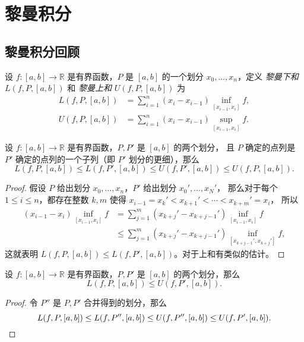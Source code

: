 \documentclass[fontset=none]{Notes}
\begin{document}
\frontmatter

\tableofcontents

\mainmatter

\chapter{黎曼积分}

\section{黎曼积分回顾}

\begin{definition}
  设 $f:[a,b]\to \mathbb{R}$ 是有界函数，$P$ 是 $[a,b]$ 的一个划分
  $x_0,\dots,x_n$，定义 \emph{黎曼下和} $L(f,P,[a,b])$ 和 \emph{黎曼上和}
  $U(f,P,[a,b])$ 为
  \begin{align*}
    L(f,P,[a,b])&=\sum_{i=1}^{n} (x_i-x_{i-1})\inf_{[x_{i-1},x_i]}f,\\
    U(f,P,[a,b])&=\sum_{i=1}^{n} (x_i-x_{i-1})\sup_{[x_{i-1},x_i]}f.
  \end{align*}
\end{definition}

\begin{lemma}[黎曼和不等式]
  设 $f:[a,b]\to \mathbb{R}$ 是有界函数，$P,P'$ 是 $[a,b]$ 的两个划分，
  且 $P$ 确定的点列是 $P'$ 确定的点列的一个子列（即 $P'$ 划分的更细），那么
  \[
    L(f,P,[a,b])\leq L(f,P',[a,b])\leq U(f,P',[a,b])\leq U(f,P,[a,b]).
  \]
\end{lemma}
\begin{proof}
  假设 $P$ 给出划分 $x_0,\dots,x_n$，$P'$ 给出划分 $x_0',\dots,x_N'$，
  那么对于每个 $1\leq i\leq n$，都存在整数 $k,m$ 使得
  $x_{i-1}=x_k'< x_{k+1}'<\cdots<x_{k+m}'=x_i$，
  所以
  \begin{align*}
    (x_{i-1}-x_i)\inf_{[x_{i-1},x_i]}f&=\sum_{j=1}^m (x_{k+j}'-x_{k+j-1}')
    \inf_{[x_{i-1},x_i]}f\\
    &\leq \sum_{j=1}^m (x_{k+j}'-x_{k+j-1}')\inf_{[x_{k+j-1}',x_{k+j}']}f,
  \end{align*}
  这就表明 $L(f,P,[a,b])\leq L(f,P',[a,b])$。对于上和有类似的估计。
\end{proof}

\begin{lemma}[黎曼下和小于黎曼上和]\label{lemma:lower sum leq upper sum}
  设 $f:[a,b]\to \mathbb{R}$ 是有界函数，$P,P'$ 是 $[a,b]$ 的两个划分，那么
  \[
    L(f,P,[a,b])\leq U(f,P',[a,b]).
  \]
\end{lemma}
\begin{proof}
  令 $P''$ 是 $P,P'$ 合并得到的划分，那么
  \[
    L(f,P,[a,b])\leq L(f,P'',[a,b])\leq U(f,P'',[a,b])\leq U
    (f,P',[a,b]).\qedhere
  \]
\end{proof}
\end{document}
